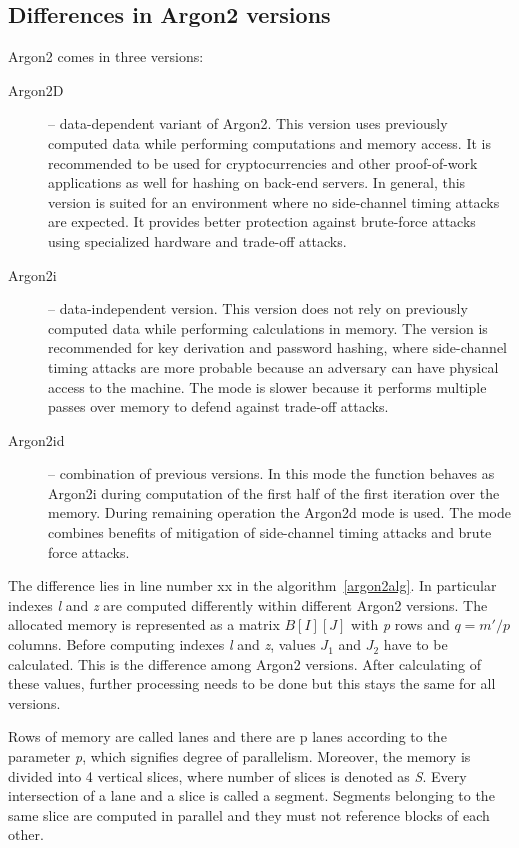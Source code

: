 \documentclass[nolof,digital]{fithesis3}
\begin{document}
\subsection{Differences in Argon2 versions}
\label{argon2versions}
Argon2 comes in three versions:

\begin{description}
\item[Argon2D] -- data-dependent variant of Argon2. This version uses previously computed data while performing computations and memory access. It is recommended to be used for cryptocurrencies and other proof-of-work applications as well for hashing on back-end servers. In general, this version is suited for an environment where no side-channel timing attacks are expected. It provides better protection against brute-force attacks using specialized hardware and trade-off attacks.

\item[Argon2i] -- data-independent version. This version does not rely on previously computed data while performing calculations in memory. The version is recommended for key derivation and password hashing, where side-channel timing attacks are more probable because an adversary can have physical access to the machine. The mode is slower because it performs multiple passes over memory to defend against trade-off attacks.

\item[Argon2id] -- combination of previous versions. In this mode the function behaves as Argon2i during computation of the first half of the first iteration over the memory. During remaining operation the Argon2d mode is used. The mode combines benefits of mitigation of side-channel timing attacks and brute force attacks.
\end{description}

The difference lies in line number xx in the algorithm~\ref{argon2alg}. In particular indexes \emph{l} and \emph{z} are computed differently within different Argon2 versions. The allocated memory is represented as a matrix \(B[I][J]\) with \emph{p} rows and \(q = m' / p\) columns. Before computing indexes \emph{l} and \emph{z}, values \(J_1\) and \(J_2\) have to be calculated. This is the difference among Argon2 versions. After calculating of these values, further processing needs to be done but this stays the same for all versions.

Rows of memory are called lanes and there are p lanes according to the parameter \emph{p}, which signifies degree of parallelism. Moreover, the memory is divided into 4 vertical slices, where number of slices is denoted as \emph{S}. Every intersection of a lane and a slice is called a segment. Segments belonging to the same slice are computed in parallel and they must not reference blocks of each other.
\end{document}
